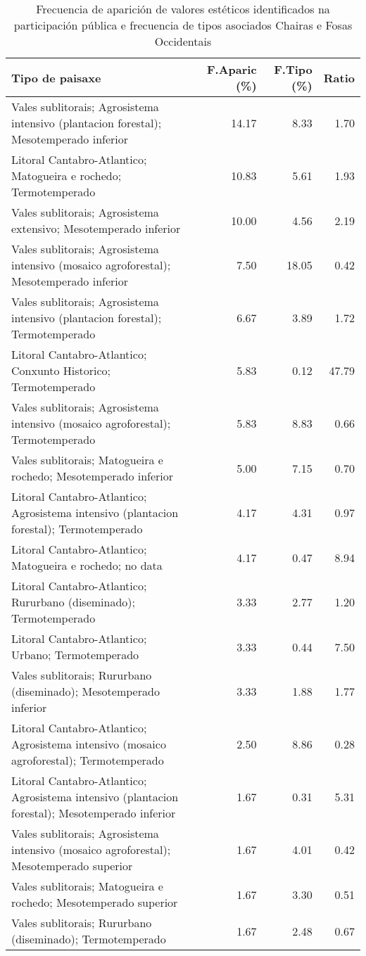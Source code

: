 \begin{table}[p]
\centering
\caption{Frecuencia de aparición de valores estéticos identificados na participación pública e frecuencia de tipos asociados Chairas e Fosas Occidentais} 
\label{vsixotest11}
\begin{tabular}{lrrr}
  \hline
Tipo de paisaxe & F.Aparic (\%) & F.Tipo (\%) & Ratio \\ 
  \hline
Vales sublitorais; Agrosistema intensivo (plantacion forestal); Mesotemperado inferior & 14.17 & 8.33 & 1.70 \\ 
  Litoral Cantabro-Atlantico; Matogueira e rochedo; Termotemperado & 10.83 & 5.61 & 1.93 \\ 
  Vales sublitorais; Agrosistema extensivo; Mesotemperado inferior & 10.00 & 4.56 & 2.19 \\ 
  Vales sublitorais; Agrosistema intensivo (mosaico agroforestal); Mesotemperado inferior & 7.50 & 18.05 & 0.42 \\ 
  Vales sublitorais; Agrosistema intensivo (plantacion forestal); Termotemperado & 6.67 & 3.89 & 1.72 \\ 
  Litoral Cantabro-Atlantico; Conxunto Historico; Termotemperado & 5.83 & 0.12 & 47.79 \\ 
  Vales sublitorais; Agrosistema intensivo (mosaico agroforestal); Termotemperado & 5.83 & 8.83 & 0.66 \\ 
  Vales sublitorais; Matogueira e rochedo; Mesotemperado inferior & 5.00 & 7.15 & 0.70 \\ 
  Litoral Cantabro-Atlantico; Agrosistema intensivo (plantacion forestal); Termotemperado & 4.17 & 4.31 & 0.97 \\ 
  Litoral Cantabro-Atlantico; Matogueira e rochedo; no data & 4.17 & 0.47 & 8.94 \\ 
  Litoral Cantabro-Atlantico; Rururbano (diseminado); Termotemperado & 3.33 & 2.77 & 1.20 \\ 
  Litoral Cantabro-Atlantico; Urbano; Termotemperado & 3.33 & 0.44 & 7.50 \\ 
  Vales sublitorais; Rururbano (diseminado); Mesotemperado inferior & 3.33 & 1.88 & 1.77 \\ 
  Litoral Cantabro-Atlantico; Agrosistema intensivo (mosaico agroforestal); Termotemperado & 2.50 & 8.86 & 0.28 \\ 
  Litoral Cantabro-Atlantico; Agrosistema intensivo (plantacion forestal); Mesotemperado inferior & 1.67 & 0.31 & 5.31 \\ 
  Vales sublitorais; Agrosistema intensivo (mosaico agroforestal); Mesotemperado superior & 1.67 & 4.01 & 0.42 \\ 
  Vales sublitorais; Matogueira e rochedo; Mesotemperado superior & 1.67 & 3.30 & 0.51 \\ 
  Vales sublitorais; Rururbano (diseminado); Termotemperado & 1.67 & 2.48 & 0.67 \\ 
   \hline
\end{tabular}
\end{table}
